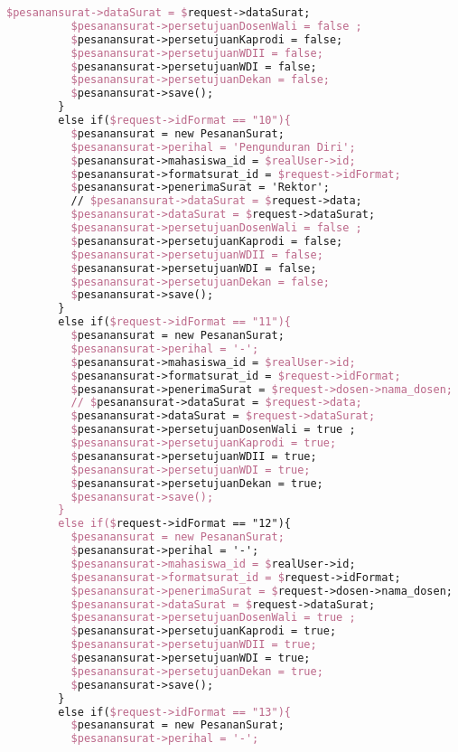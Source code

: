 \begin{lstlisting}[language=tex,basicstyle=\tiny,caption=PesanansuratController.php]
          $pesanansurat->dataSurat = $request->dataSurat;
          $pesanansurat->persetujuanDosenWali = false ;
          $pesanansurat->persetujuanKaprodi = false;
          $pesanansurat->persetujuanWDII = false;
          $pesanansurat->persetujuanWDI = false;
          $pesanansurat->persetujuanDekan = false;
          $pesanansurat->save();
        }
        else if($request->idFormat == "10"){
          $pesanansurat = new PesananSurat;
          $pesanansurat->perihal = 'Pengunduran Diri';
          $pesanansurat->mahasiswa_id = $realUser->id;
          $pesanansurat->formatsurat_id = $request->idFormat;
          $pesanansurat->penerimaSurat = 'Rektor';
          // $pesanansurat->dataSurat = $request->data;
          $pesanansurat->dataSurat = $request->dataSurat;
          $pesanansurat->persetujuanDosenWali = false ;
          $pesanansurat->persetujuanKaprodi = false;
          $pesanansurat->persetujuanWDII = false;
          $pesanansurat->persetujuanWDI = false;
          $pesanansurat->persetujuanDekan = false;
          $pesanansurat->save();
        }
        else if($request->idFormat == "11"){
          $pesanansurat = new PesananSurat;
          $pesanansurat->perihal = '-';
          $pesanansurat->mahasiswa_id = $realUser->id;
          $pesanansurat->formatsurat_id = $request->idFormat;
          $pesanansurat->penerimaSurat = $request->dosen->nama_dosen;
          // $pesanansurat->dataSurat = $request->data;
          $pesanansurat->dataSurat = $request->dataSurat;
          $pesanansurat->persetujuanDosenWali = true ;
          $pesanansurat->persetujuanKaprodi = true;
          $pesanansurat->persetujuanWDII = true;
          $pesanansurat->persetujuanWDI = true;
          $pesanansurat->persetujuanDekan = true;
          $pesanansurat->save();
        }
        else if($request->idFormat == "12"){
          $pesanansurat = new PesananSurat;
          $pesanansurat->perihal = '-';
          $pesanansurat->mahasiswa_id = $realUser->id;
          $pesanansurat->formatsurat_id = $request->idFormat;
          $pesanansurat->penerimaSurat = $request->dosen->nama_dosen;
          $pesanansurat->dataSurat = $request->dataSurat;
          $pesanansurat->persetujuanDosenWali = true ;
          $pesanansurat->persetujuanKaprodi = true;
          $pesanansurat->persetujuanWDII = true;
          $pesanansurat->persetujuanWDI = true;
          $pesanansurat->persetujuanDekan = true;
          $pesanansurat->save();
        }
        else if($request->idFormat == "13"){
          $pesanansurat = new PesananSurat;
          $pesanansurat->perihal = '-';

\end{lstlisting}

